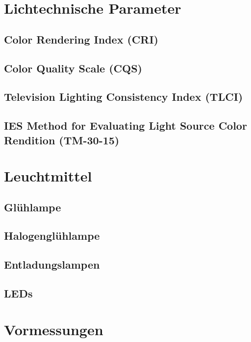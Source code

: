 \chapter{Lichtechnische Parameter}

\section{Color Rendering Index (CRI)} \label{sec_cri}

\section{Color Quality Scale (CQS)} \label{sec_cqs}

\section{Television Lighting Consistency Index (TLCI)} \label{sec_tlci}

\section{IES Method for Evaluating Light Source Color Rendition (TM-30-15)} \label{sec_tm30}

\chapter{Leuchtmittel}

\section{Glühlampe} \label{sec_glühlampe}

\section{Halogenglühlampe} \label{sec_halogenglühlampe}

\section{Entladungslampen} \label{sec_entladungslampe}

\section{LEDs} \label{sec_led}

\chapter{Vormessungen}

